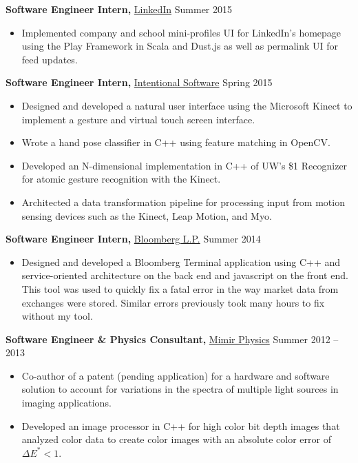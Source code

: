 \documentclass[margin]{res}
\begin{document}
\begin{minipage}{\textwidth}
\begin{resume}
{\bf Software Engineer Intern,} \uline{LinkedIn} \hfill Summer 2015
 \begin{itemize} \itemsep -2pt %
 \item Implemented company and school mini-profiles UI for LinkedIn's homepage using the Play Framework in Scala and Dust.js as well as permalink UI for feed updates.
 \end{itemize}



{\bf Software Engineer Intern,} \uline{Intentional Software} \hfill Spring 2015
 \begin{itemize} \itemsep -2pt %
 \item Designed and developed a natural user interface using the Microsoft Kinect to implement a gesture and virtual touch screen interface.
 \item Wrote a hand pose classifier in C++ using feature matching in OpenCV.
 \item Developed an N-dimensional implementation in C++ of UW's \$1 Recognizer for atomic gesture recognition with the Kinect. %
 \item Architected a data transformation pipeline for processing input from motion sensing devices such as the Kinect, Leap Motion, and Myo.
 \end{itemize}



{\bf Software Engineer Intern,} \uline{Bloomberg L.P.} \hfill Summer 2014
 \begin{itemize} \itemsep -2pt
 \item Designed and developed a Bloomberg Terminal application using C++ and service-oriented architecture on the back end and javascript on the front end. This tool was used to quickly fix a fatal error in the way market data from exchanges were stored. Similar errors previously took many hours to fix without my tool.
 \end{itemize}



{\bf Software Engineer \& Physics Consultant,} \uline{Mimir Physics} \hfill Summer 2012 -- 2013
 \begin{itemize} \itemsep -2pt  %
 \item Co-author of a patent (pending application) for a hardware and software solution to account for variations in the spectra of multiple light sources in imaging applications.
 \item Developed an image processor in C++ for high color bit depth images that analyzed color data to create color images with an absolute color error of $\Delta E^* < 1$.
 \end{itemize}


\end{resume}
\end{minipage}
\end{document}
